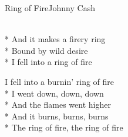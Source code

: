\documentclass[10.5pt]{book}
\begin{document}
\begin{poem}{Ring of Fire}{Johnny Cash}

\settowidth{\versewidth}{I fell into a burnin' ring of fire}

\\*
And it makes a firery ring\\*
Bound by wild desire\\*
I fell into a ring of fire

I fell into a burnin' ring of fire\\*
I went down, down, down\\*
And the flames went higher\\*
And it burns, burns, burns\\*
The ring of fire, the ring of fire

\end{poem}
\end{document}
